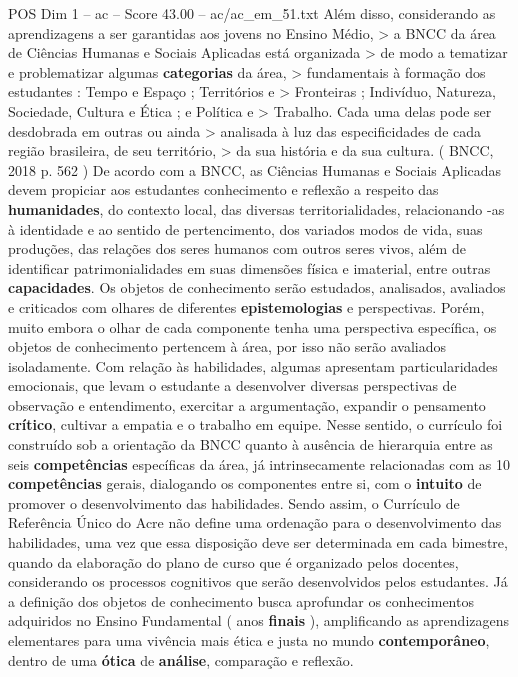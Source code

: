 \begin{textsample}{POS Dim 1 – ac – Score 43.00 – ac/ac\_em\_51.txt}
Além disso, considerando as aprendizagens a ser garantidas aos jovens no Ensino Médio, > a BNCC da área de Ciências Humanas e Sociais Aplicadas está organizada > de modo a tematizar e problematizar algumas \textbf{categorias} da área, > fundamentais à formação dos estudantes : Tempo e Espaço ; Territórios e > Fronteiras ; Indivíduo, Natureza, Sociedade, Cultura e Ética ; e Política e > Trabalho.
Cada uma delas pode ser desdobrada em outras ou ainda > analisada à luz das especificidades de cada região brasileira, de seu território, > da sua história e da sua cultura. ( BNCC, 2018 p. 562 ) De acordo com a BNCC, as Ciências Humanas e Sociais Aplicadas devem propiciar aos estudantes conhecimento e reflexão a respeito das \textbf{humanidades}, do contexto local, das diversas territorialidades, relacionando -as à identidade e ao sentido de pertencimento, dos variados modos de vida, suas produções, das relações dos seres humanos com outros seres vivos, além de identificar patrimonialidades em suas dimensões física e imaterial, entre outras \textbf{capacidades}.
Os objetos de conhecimento serão estudados, analisados, avaliados e criticados com olhares de diferentes \textbf{epistemologias} e perspectivas.
Porém, muito embora o olhar de cada componente tenha uma perspectiva específica, os objetos de conhecimento pertencem à área, por isso não serão avaliados isoladamente.
Com relação às habilidades, algumas apresentam particularidades emocionais, que levam o estudante a desenvolver diversas perspectivas de observação e entendimento, exercitar a argumentação, expandir o pensamento \textbf{crítico}, cultivar a empatia e o trabalho em equipe.
Nesse sentido, o currículo foi construído sob a orientação da BNCC quanto à ausência de hierarquia entre as seis \textbf{competências} específicas da área, já intrinsecamente relacionadas com as 10 \textbf{competências} gerais, dialogando os componentes entre si, com o \textbf{intuito} de promover o desenvolvimento das habilidades.
Sendo assim, o Currículo de Referência Único do Acre não define uma ordenação para o desenvolvimento das habilidades, uma vez que essa disposição deve ser determinada em cada bimestre, quando da elaboração do plano de curso que é organizado pelos docentes, considerando os processos cognitivos que serão desenvolvidos pelos estudantes.
Já a definição dos objetos de conhecimento busca aprofundar os conhecimentos adquiridos no Ensino Fundamental ( anos \textbf{finais} ), amplificando as aprendizagens elementares para uma vivência mais ética e justa no mundo \textbf{contemporâneo}, dentro de uma \textbf{ótica} de \textbf{análise}, comparação e reflexão.

\end{textsample}
